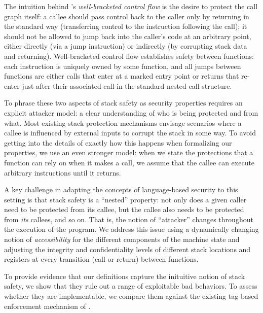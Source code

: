 \documentclass[acmsmall,review,anonymous]{acmart}\settopmatter{printfolios=true,printccs=false,printacmref=false}
\begin{document}
The intuition behind \citeauthor{Skorstengaard+19}'s {\em well-bracketed control
  flow} is
the desire to protect the call graph itself: a callee should pass control
back to the caller only by returning in the standard way (transferring
control to the instruction following the call); it should
not be
allowed to jump back into the caller's code at an arbitrary point, either
directly (via a jump instruction) or indirectly (by corrupting stack
data and returning). Well-bracketed control flow establishes safety
between functions: each instruction is uniquely owned by some
function, and all jumps between functions are either calls that enter
at a marked entry point or returns that re-enter just after their
associated call in the standard nested call structure.  

To phrase these two aspects of stack safety as security properties requires
an explicit attacker model: a clear understanding of who is being protected
and from what. Most existing stack protection mechanisms envisage scenarios
where a callee is influenced by external inputs to corrupt the stack in some
way. To avoid getting into the details of exactly how this happens when
formalizing our properties, we use an even stronger model: when we state the
protections that a function can rely on when it makes a call, we assume that
the callee can execute arbitrary instructions until it returns.

A key challenge in adapting the concepts of language-based security to this
setting is that stack safety is a ``nested'' property: not only does a given
caller need to be protected from its callee, but the callee also needs to be
protected from {\em its} callees, and so on. That is, the notion of
``attacker'' changes throughout the execution of the program.  We address
this issue using a dynamically changing notion of {\em accessibility} for
the different components of the machine state and adjusting the integrity
and confidentiality levels of different stack locations and registers at
every transition (call or return) between functions.

%
To provide evidence that our definitions capture the inituitive notion
of stack safety, we show that they rule out a range of exploitable bad
behaviors.  To assess whether they are
implementable, we compare them against
the existing tag-based enforcement mechanism of
\citet{DBLP:conf/sp/RoesslerD18}.
\end{document}
